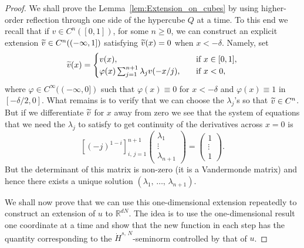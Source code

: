 \documentclass[AHL, Unicode, longabstracts, published]{cedram}
\newcommand*\R {\mathbb{R}}
\newcommand\1{{\ensuremath {\mathds 1} }}
\let\oldtilde\tilde
\renewcommand*{\tilde}[1]{\mathchoice{\widetilde{#1}}{\widetilde{#1}}{\oldtilde{#1}}{\oldtilde{#1}}}\let\oldhat\hat
\renewcommand*{\hat}[1]{\mathchoice{\widehat{#1}}{\widehat{#1}}{\oldhat{#1}}{\oldhat{#1}}}\let\oldforall\forall
\renewcommand*{\forall}{\mathrel{\oldforall}}
\begin{document}
\begin{proof}
We shall prove the Lemma~\ref{lem:Extension_on_cubes} by using higher-order reflection through one side of the hypercube $Q$ at a time. To this end we recall that if $v\in C^n([0, 1])$, for some $n\geq 0$, we can construct an explicit extension $\tilde v\in C^n((-\infty, 1])$ satisfying $\tilde v(x)=0$ when $x<-\delta$. Namely, set
\begin{equation*}
\tilde v(x)=
\begin{cases}
v(x), \quad &\text{if } x\in [0, 1],\\
\varphi(x)\sum_{j=1}^{n+1} \lambda_j v(-x/j), \quad &\text{if } x<0,
\end{cases}
\end{equation*}
where $\varphi \in C^\infty((-\infty, 0])$ such that $\varphi(x)\equiv 0$ for $x<-\delta$ and $\varphi(x)\equiv 1$ in $[-\delta/2, 0]$. What remains is to verify that we can choose the $\lambda_j$'s so that $\tilde v\in C^n$. But if we differentiate $\tilde v$ for $x$ away from zero we see that the system of equations that we need the $\lambda_j$ to satisfy to get continuity of the derivatives across $x=0$ is
\begin{equation*}
\left[(-j)^{1-i}\right]_{i,\,j=1}^{n+1}\left(
\begin{matrix}
\lambda_1 \\ \vdots \\ \lambda_{n+1}
\end{matrix}\right) =\left(
\begin{matrix}
1\\ \vdots \\ 1
\end{matrix}\right).
\end{equation*}
But the determinant of this matrix is non-zero (it is a Vandermonde matrix) and hence there exists a unique solution $(\lambda_1,\,\ldots,\,\lambda_{n+1})$.

We shall now prove that we can use this one-dimensional extension repeatedly to construct an extension of $u$ to $\R^{dN}$. The idea is to use the one-dimensional result one coordinate at a time and show that the new function in each step has the quantity corresponding to the $\dot{H}^{s,\,N}$-seminorm controlled by that of $u$.


\end{proof}
\end{document}
